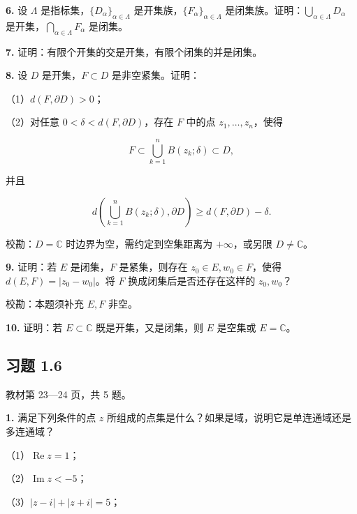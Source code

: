 \documentclass[11pt,a4paper]{article}
\begin{document}
\par{}
\noindent\textbf{6.} 设 \(\Lambda\) 是指标集，\(\{D_\alpha\}_{\alpha\in\Lambda}\)
是开集族，\(\{F_\alpha\}_{\alpha\in\Lambda}\)
是闭集族。证明：\(\bigcup_{\alpha\in\Lambda}D_\alpha\)
是开集，\(\bigcap_{\alpha\in\Lambda}F_\alpha\) 是闭集。

\par{}
\noindent\textbf{7.} 证明：有限个开集的交是开集，有限个闭集的并是闭集。

\par{}
\noindent\textbf{8.} 设 \(D\) 是开集，\(F\subset D\) 是非空紧集。证明：

（1）\(d(F,\partial D)>0\)；

（2）对任意 \(0<\delta<d(F,\partial D)\)，存在 \(F\) 中的点
\(z_1,\ldots,z_n\)，使得

\[
F\subset\bigcup_{k=1}^nB(z_k;\delta)\subset D,
\]

并且

\[
d\left(\bigcup_{k=1}^nB(z_k;\delta),\partial D\right)
\ge d(F,\partial D)-\delta.
\]

校勘：\(D=\mathbb C\) 时边界为空，需约定到空集距离为 \(+\infty\)，或另限
\(D\ne\mathbb C\)。

\par{}
\noindent\textbf{9.} 证明：若 \(E\) 是闭集，\(F\) 是紧集，则存在
\(z_0\in E,w_0\in F\)，使得 \(d(E,F)=|z_0-w_0|\)。将 \(F\)
换成闭集后是否还存在这样的 \(z_0,w_0\)？

校勘：本题须补充 \(E,F\) 非空。

\par{}
\noindent\textbf{10.} 证明：若 \(E\subset\mathbb C\) 既是开集，又是闭集，则 \(E\)
是空集或 \(E=\mathbb C\)。

\subsection{习题 1.6}\label{ux4e60ux9898-1.6}

教材第 23---24 页，共 5 题。

\par{}
\noindent\textbf{1.} 满足下列条件的点 \(z\)
所组成的点集是什么？如果是域，说明它是单连通域还是多连通域？

（1）\(\operatorname{Re}z=1\)；

（2）\(\operatorname{Im}z<-5\)；

（3）\(|z-i|+|z+i|=5\)；
\end{document}
